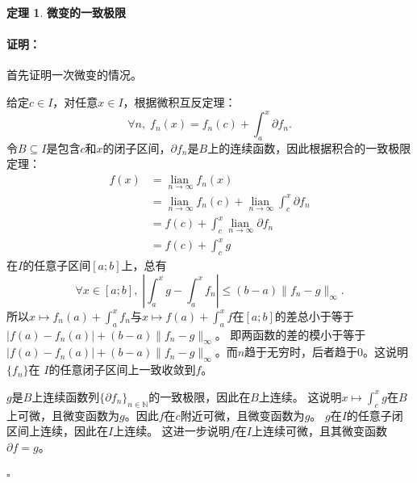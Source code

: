 \documentclass[12pt,UTF8]{ctexbook}
\newcommand{\lian}[1]{
    \underset{#1}{\operatorname{lian}\,}
}
\theoremstyle{definition}
\newtheorem{tm}{定理}[section]
\theoremstyle{plain}
\renewenvironment{proof}{\paragraph{\textbf{证明：}}}{\hfill$\square$}
\begin{document}
\begin{appendix}
\begin{tm}{\textbf{微变的一致极限}}
\end{tm}

\begin{proof}
    首先证明一次微变的情况。
    
    给定$c\in I$，对任意$x\in I$，根据微积互反定理：
    $$ \forall n,\; f_n(x) = f_n(c) + \int_a^x \partial f_n. $$
    令$B\subseteq I$是包含$c$和$x$的闭子区间，$\partial f_n$是$B$上的连续函数，因此根据积合的一致极限定理：
    \begin{align*}
        f(x) &= \lian{n\to\infty} f_n(x) \\
        &= \lian{n\to\infty} f_n(c) + \lian{n\to\infty} \int_c^x \partial f_n \\
        &= f(c) + \int_c^x \lian{n\to\infty} \partial f_n \\
        &= f(c) + \int_c^x g
    \end{align*}
    在$I$的任意子区间$[a;b]$上，总有
    $$ \forall x \in [a;b], \; \left|\int_a^x g - \int_a^x f_n \right| \leqslant (b - a) \|f_n - g\|_{\infty}.$$
    所以$x\mapsto f_n(a) + \int_a^x f_n$与$x\mapsto f(a) + \int_a^x f$在$[a;b]$的差总小于等于$|f(a) - f_n(a)| + (b - a) \|f_n - g\|_{\infty}$。
    即两函数的差的模小于等于$|f(a) - f_n(a)| + (b - a) \|f_n - g\|_{\infty}$。而$n$趋于无穷时，后者趋于$0$。这说明$\{f_n\}$在
    $I$的任意闭子区间上一致收敛到$f$。

    $g$是$B$上连续函数列$\{\partial f_n\}_{n\in\mathbb{N}}$的一致极限，因此在$B$上连续。
    这说明$x\mapsto \int_c^x g $在$B$上可微，且微变函数为$g$。因此$f$在$c$附近可微，且微变函数为$g$。
    $g$在$I$的任意子闭区间上连续，因此在$I$上连续。
    这进一步说明$f$在$I$上连续可微，且其微变函数$\partial f = g$。
    

\end{proof}
\end{appendix}
\end{document}
